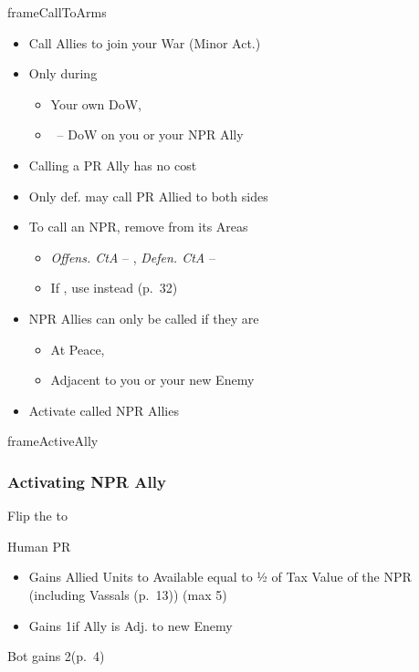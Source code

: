 \documentclass[10pt]{article}
\newlength{\fhActiveAlly} \setlength\fhActiveAlly{8\baselineskip}
\newlength{\fhCallToArms} \setlength\fhCallToArms{14\baselineskip}
\begin{document}
\begin{dynamiccontents*}{frameCallToArms}\begin{eubox}{\fhCallToArms}
	\begin{itemize}
		\item Call Allies to join your War (Minor Act.)
		\item Only during
		\begin{itemize}
			\item Your own DoW, 
			\item \reaction~-- DoW on you or your NPR Ally
		\end{itemize}
		\item Calling a PR Ally has no cost
		\item Only def. may call PR Allied to both sides
		\item To call an NPR, remove \influence from its Areas
		\begin{itemize}
			\item \emph{Offens. CtA} -- \strong{2\influence}, \emph{Defen. CtA} -- \strong{1\influence}
			\item If , use \colonists instead (p.~32)
		\end{itemize}
		\item NPR Allies can only be called if they are
		\begin{itemize}
			\item At Peace, 
			\item Adjacent to you or your new Enemy
		\end{itemize}
		\item {}Activate called NPR Allies
	\end{itemize}
\end{eubox}\end{dynamiccontents*}

\begin{dynamiccontents*}{frameActiveAlly}\begin{eubox}{\fhActiveAlly}
	\subsubsection*{Activating NPR Ally }
	\begin{itemize}
		\item Flip the \alliance to \activeally
		\item Human PR
		\begin{itemize}
			\item Gains Allied Units to Available \manpower equal to ½ of Tax Value of the NPR (including Vassals (p.~13)) (max 5)
			\item Gains 1\milpower if Ally is Adj. to new Enemy
			\end{itemize}
		{\botrules
		\item Bot gains 2\botpower (p.~4)
		}
	\end{itemize}
\end{eubox}\end{dynamiccontents*}
\end{document}
